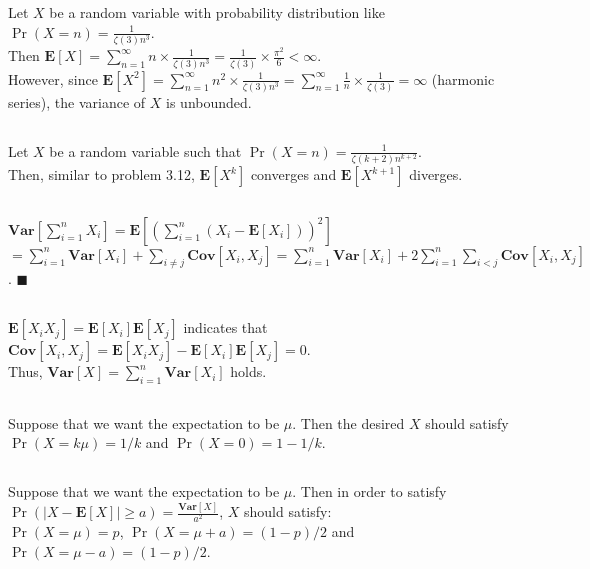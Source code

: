 \documentclass{article}
\begin{document}
\subsection{}
Let $X$ be a random variable with probability distribution like $\Pr(X=n)=\frac{1}{\zeta (3)n^3}$.\\
Then $\textbf{E}[X]=\sum\limits_{n=1}^\infty n\times\frac{1}{\zeta (3)n^3}=\frac{1}{\zeta(3)}\times\frac{\pi^2}{6}<\infty$.\\
However, since $\textbf{E}[X^2]=\sum\limits_{n=1}^\infty n^2\times\frac{1}{\zeta (3)n^3}=\sum\limits_{n=1}^\infty \frac{1}{n}\times\frac{1}{\zeta (3)}=\infty$ (harmonic series), the variance of $X$ is unbounded.
\subsection{}
Let $X$ be a random variable such that $\Pr(X=n)=\frac{1}{\zeta (k+2)n^{k+2}}$.\\
Then, similar to problem 3.12, $\textbf{E}[X^k]$ converges and $\textbf{E}[X^{k+1}]$ diverges.
\subsection{}
$\textbf{Var}[\sum\limits_{i=1}^nX_i]=\textbf{E}\left[\left(\sum\limits_{i=1}^n(X_i-\textbf{E}[X_i])\right)^2\right]$
$=\sum\limits_{i=1}^n\textbf{Var}[X_i]+\sum\limits_{i\neq j}\textbf{Cov}[X_i,X_j]=\sum\limits_{i=1}^n\textbf{Var}[X_i]+2\sum\limits_{i=1}^n\sum\limits_{i<j}\textbf{Cov}[X_i,X_j]$. $\blacksquare$
\subsection{}
$\textbf{E}[X_iX_j]=\textbf{E}[X_i]\textbf{E}[X_j]$ indicates that $\textbf{Cov}[X_i,X_j]=\textbf{E}[X_iX_j]-\textbf{E}[X_i]\textbf{E}[X_j]=0$.\\
Thus, $\textbf{Var}[X]=\sum\limits_{i=1}^n\textbf{Var}[X_i]$ holds.
\subsection{}
Suppose that we want the expectation to be $\mu$.
Then the desired $X$ should satisfy $\Pr(X=k\mu)=1/k$ and $\Pr(X=0)=1-1/k$.
\subsection{}
Suppose that we want the expectation to be $\mu$.
Then in order to satisfy $\Pr(|X-\textbf{E}[X]|\geq a)=\frac{\textbf{Var}[X]}{a^2}$, $X$ should satisfy:\\
$\Pr(X=\mu)=p$, $\Pr(X=\mu+a)=(1-p)/2$ and $\Pr(X=\mu-a)=(1-p)/2$.
\end{document}
